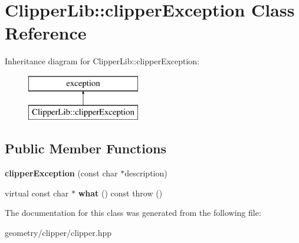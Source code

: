 \hypertarget{class_clipper_lib_1_1clipper_exception}{}\section{Clipper\+Lib\+:\+:clipper\+Exception Class Reference}
\label{class_clipper_lib_1_1clipper_exception}
Inheritance diagram for Clipper\+Lib\+:\+:clipper\+Exception\+:\begin{figure}[H]
\begin{center}
\leavevmode
\includegraphics[height=2.000000cm]{class_clipper_lib_1_1clipper_exception}
\end{center}
\end{figure}
\subsection*{Public Member Functions}
\begin{DoxyCompactItemize}
\item 
\mbox{\label{class_clipper_lib_1_1clipper_exception_a7d44b32d06cd870500355667f6e0d6ed}} 
{\bfseries clipper\+Exception} (const char $\ast$description)
\item 
\mbox{\label{class_clipper_lib_1_1clipper_exception_a32b7ac5a3176d9040ef0a863fd54657a}} 
virtual const char $\ast$ {\bfseries what} () const  throw ()
\end{DoxyCompactItemize}


The documentation for this class was generated from the following file\+:\begin{DoxyCompactItemize}
\item 
geometry/clipper/clipper.\+hpp\end{DoxyCompactItemize}
